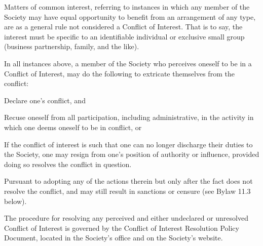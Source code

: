 \begin{longenum}[ label*=\thesection.\arabic*., align=left]
\begin{itemize}
    \end{itemize}
    \begin{longenum}[ label*=\arabic*., align=left]
	\item Matters of common interest, referring to instances in which any member of the Society may have equal opportunity to  benefit from an arrangement of any type, are as a general  rule not considered a Conflict of Interest. That is to say, the interest must be specific to an identifiable individual or exclusive small group (business partnership, family, and the like). 
	\end{longenum}
    \item In all instances above, a member of the Society who perceives oneself to be in a Conflict of Interest, may do the following to extricate themselves from the conflict:
    \begin{longenum}[ label*=\arabic*., align=left]
		\item Declare one's conflict, and
        \begin{longenum}[ label*=\arabic*., align=left]
			\item Recuse oneself from all participation, including administrative, in the activity in which one deems oneself to be in conflict, or
            \item If the conflict of interest is such that one can no longer discharge their duties to the Society, one may resign from one's position of authority or influence, provided doing so resolves the conflict in question.
		\end{longenum}
        \item Pursuant to adopting any of the actions therein but only after the fact does not resolve the conflict, and may still result in sanctions or censure (see Bylaw 11.3 below).
	\end{longenum}
    \item The procedure for resolving any perceived and either undeclared or unresolved Conflict of Interest is governed by the Conflict of Interest Resolution Policy Document, located in the Society's office and on the Society's website.
    
\end{longenum}
\newpage

